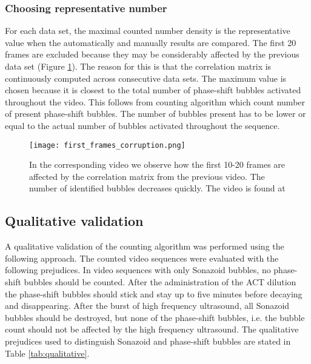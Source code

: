 \subsubsection{Choosing representative number} 
For each data set, the maximal counted number density is the representative value when the automatically and manually results are compared. The first 20 frames are excluded because they may be considerably affected by the previous data set (Figure \ref{Fig:first_frames}). The reason for this is that the correlation matrix is continuously computed across consecutive data sets. The maximum value is chosen because it is closest to the total number of phase-shift bubbles activated throughout the video. This follows from counting algorithm which count number of present phase-shift bubbles. The number of bubbles present has to be lower or equal to the actual number of bubbles activated throughout the sequence.

\begin{figure}[h]
	\centering
	\texttt{[image: first\_frames\_corruption.png]}
	\cprotect\caption{In the corresponding video we observe how the first 10-20 frames are affected by the correlation matrix from the previous video. The number of identified bubbles decreases quickly. The video is found at }
	\label{Fig:first_frames}
\end{figure}

\subsection{Qualitative validation}
\label{sec:qualitative}
A qualitative validation of the counting algorithm was performed using the following approach. The counted video sequences were evaluated with the following prejudices. In video sequences with only Sonazoid\texttrademark{} bubbles, no phase-shift bubbles should be counted. After the administration of the ACT\texttrademark{} dilution the phase-shift bubbles should stick and stay up to five minutes before decaying and disappearing. After the burst of high frequency ultrasound, all Sonazoid\texttrademark{} bubbles should be destroyed, but none of the phase-shift bubbles, i.e. the bubble count should not be affected by the high frequency ultrasound. The qualitative prejudices used to distinguish Sonazoid\texttrademark{} and phase-shift bubbles are stated in Table \ref{tab:qualitative}.


